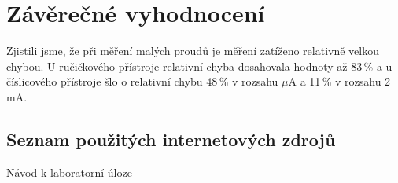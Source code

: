 \documentclass[a4paper,12pt]{article}   %
\newcommand{\tmu}{$\mu$}
\begin{document}
\section{Závěrečné vyhodnocení}
Zjistili jsme, že při měření malých proudů je měření zatíženo relativně velkou chybou. U ručičkového přístroje relativní chyba dosahovala hodnoty až 83\,\% a u číslicového přístroje šlo o relativní chybu 48\,\% v rozsahu \tmu A a 11\,\% v rozsahu 2\,mA.



\clearpage
\renewcommand{\refname}{Seznam použité literatury a~zdrojů informací} 

\begin{thebibliography}{99}

\subsection*{Seznam použitých internetových zdrojů}
     Návod k laboratorní úloze
    
\end{thebibliography}
\end{document}
